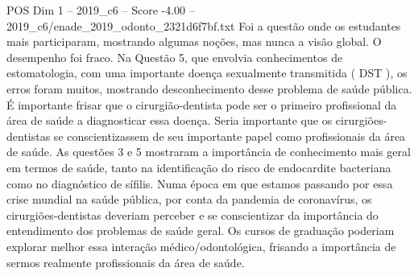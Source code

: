 \begin{textsample}{POS Dim 1 – 2019\_c6 – Score -4.00 – 2019\_c6/enade\_2019\_odonto\_2321d6f7bf.txt}
Foi a questão onde os estudantes mais participaram, mostrando algumas noções, mas nunca a visão global.
O desempenho foi fraco.
Na Questão 5, que envolvia conhecimentos de estomatologia, com uma importante doença sexualmente transmitida ( DST ), os erros foram muitos, mostrando desconhecimento desse problema de saúde pública.
É importante frisar que o cirurgião-dentista pode ser o primeiro profissional da área de saúde a diagnosticar essa doença.
Seria importante que os cirurgiões-dentistas se conscientizassem de seu importante papel como profissionais da área de saúde.
As questões 3 e 5 mostraram a importância de conhecimento mais geral em termos de saúde, tanto na identificação do risco de endocardite bacteriana como no diagnóstico de sífilis.
Numa época em que estamos passando por essa crise mundial na saúde pública, por conta da pandemia de coronavírus, os cirurgiões-dentistas deveriam perceber e se conscientizar da importância do entendimento dos problemas de saúde geral.
Os cursos de graduação poderiam explorar melhor essa interação médico/odontológica, frisando a importância de sermos realmente profissionais da área de saúde.

\end{textsample}
